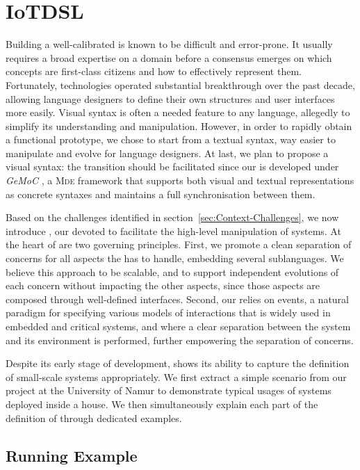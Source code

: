 \section{IoTDSL}
\label{sec:IoTDSL}

Building a well-calibrated \DSL is known to be difficult and error-prone. It usually requires a broad expertise on a domain before a consensus emerges on which concepts are first-class citizens and how to effectively represent them. Fortunately, \MDE technologies operated substantial breakthrough over the past decade, allowing language designers to define their own \DSL structures and user interfaces more easily. Visual syntax is often a needed feature to any language, allegedly to simplify its understanding and manipulation. However, in order to rapidly obtain a functional prototype, we chose to start from a textual syntax, way easier to manipulate and evolve for language designers. At last, we plan to propose a visual syntax: the transition should be facilitated since our \DSL is developed under \textit{GeMoC} \cite{Bousse-Degueule-Vojtisek-etAl:2016}, a \textsc{Mde} framework that supports both visual and textual representations as concrete syntaxes and maintains a full synchronisation between them.

Based on the challenges identified in section~\ref{sec:Context-Challenges}, we now introduce \IOTDSL, our \DSL devoted to facilitate the high-level manipulation of \IOT systems. At the heart of \IOTDSL are two governing principles. First, we promote a clean separation of concerns for all aspects the \DSL has to handle, embedding several sublanguages. We believe this approach to be scalable, and to support independent evolutions of each concern without impacting the other aspects, since those aspects are composed through well-defined interfaces. Second, our \DSL relies on events, a natural paradigm for specifying various models of interactions that is widely used in embedded and critical systems, and where a clear separation between the system and its environment is performed, further empowering the separation of concerns.

Despite its early stage of development, \IOTDSL shows its ability to capture the definition of small-scale \IOT systems appropriately. We first extract a simple scenario from our project at the University of Namur to demonstrate typical usages of \IOT systems deployed inside a house. We then simultaneously explain each part of the definition of \IOTDSL through dedicated examples.


\subsection{Running Example}
\label{sec:IoTDSL-Example}

